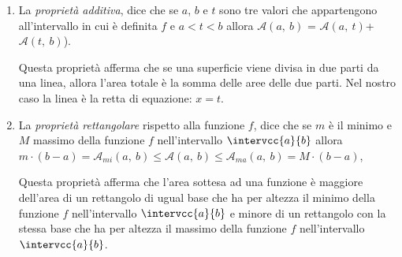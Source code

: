 \begin{enumerate}
 \item
La \emph{proprietà additiva}, dice che se \(a\), \(b\) e \(t\) 
sono tre valori che appartengono all'intervallo in cui è definita \(f\) e 
\(a < t < b\)
allora \(\mathcal{A}(a,~b)\) = 
\(\mathcal{A}(a,~t)\)+\(\mathcal{A}(t,~b)\)).

\begin{minipage}{.49\textwidth}
\begin{inaccessibleblock} 
  \areasottesacurva
\end{inaccessibleblock}
\end{minipage}
\hfill
\begin{minipage}{.49\textwidth}
\begin{inaccessibleblock} 
  \propradditiva
\end{inaccessibleblock}
\end{minipage}

Questa proprietà afferma che se una superficie 
viene divisa in due parti da una linea, 
allora l'area totale è la somma delle aree delle due parti.
Nel nostro caso la linea è la retta di equazione: \(x = t\).

 \item 
La \emph{proprietà rettangolare} rispetto alla funzione \(f\), 
dice che se \(m\) è il minimo e \(M\) massimo della funzione \(f\) 
nell'intervallo \(\intervcc{a}{b}\)
allora \\
\(m\cdot(b-a) = \mathcal{A}_{mi}(a,~b) \leq \mathcal{A}(a,~b) \leq
                       \mathcal{A}_{ma}(a,~b) = M\cdot(b-a)\),

\begin{minipage}{.49\textwidth}
\begin{inaccessibleblock} 
  \areaminore
\end{inaccessibleblock}
\end{minipage}
\hfill
\begin{minipage}{.49\textwidth}
\begin{inaccessibleblock} 
  \areamaggiore
\end{inaccessibleblock}
\end{minipage}

Questa proprietà afferma che l'area sottesa ad una funzione è maggiore 
dell'area di un rettangolo di ugual base che ha per altezza il minimo della 
funzione \(f\) nell'intervallo \(\intervcc{a}{b}\) 
e minore di un rettangolo con la stessa base che ha per altezza il massimo 
della funzione \(f\) nell'intervallo \(\intervcc{a}{b}\). 
\end{enumerate}

